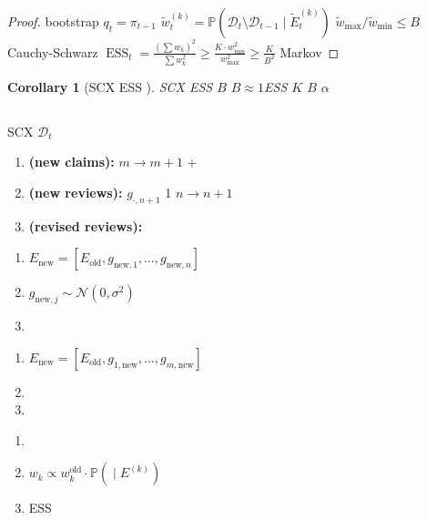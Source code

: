 \documentclass[12pt,a4paper]{article}
\theoremstyle{plain}
\newtheorem{corollary}[theorem]{ Corollary}
\theoremstyle{definition}
\newcommand{\Pbb}{\mathbb{P}}
\newcommand{\D}{\mathcal{D}}
\newcommand{\Ncal}{\mathcal{N}}
\DeclareMathOperator{\ESS}{ESS}
\begin{document}
\begin{proof}
 bootstrap  $q_t = \pi_{t-1}$ 
$\tilde{w}_t^{(k)} = \Pbb(\D_t \setminus \D_{t-1} \mid \tilde{E}_t^{(k)})$
 $\tilde{w}_{\max} / \tilde{w}_{\min} \leq B$
 Cauchy-Schwarz
$\ESS_t = \frac{(\sum w_k)^2}{\sum w_k^2} \geq \frac{K \cdot w_{\min}^2}{w_{\max}^2} \geq \frac{K}{B^2}$
 Markov 
\end{proof}

\begin{corollary}[SCX  ESS ]
SCX  ESS  $B$ 
$B \approx 1$ESS  $K$ $B$ 
 $\alpha$
\end{corollary}

\subsection{}

SCX  $\D_t$ 

\begin{enumerate}[label=\textbf{ \arabic*:}]
    \item \textbf{ (new claims):}  $m \to m+1$
         + 
    \item \textbf{ (new reviews):}  $g_{\cdot, n+1}$
         1 $n \to n+1$
    \item \textbf{ (revised reviews):} 
        
\end{enumerate}

\begin{algobox}
\textbf{}
\begin{enumerate}
    \item $E_{\text{new}} = [E_{\text{old}}, g_{\text{new},1}, \ldots, g_{\text{new},n}]$
    \item $g_{\text{new},j} \sim \Ncal(0, \sigma^2)$
    \item 
\end{enumerate}

\textbf{}
\begin{enumerate}
    \item $E_{\text{new}} = [E_{\text{old}}, g_{1,\text{new}}, \ldots, g_{m,\text{new}}]$
    \item 
    \item 
\end{enumerate}

\textbf{}
\begin{enumerate}
    \item 
    \item $w_k \propto w_k^{\text{old}} \cdot \Pbb(\text{} \mid E^{(k)})$
    \item  ESS 
\end{enumerate}
\end{algobox}
\end{document}
